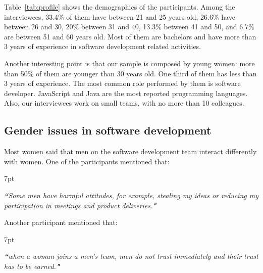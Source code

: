 \documentclass{IEEEcsmag}
\newenvironment{formal}{%
  \def\FrameCommand{%
    \hspace{1pt}%
    {\color{formalshade}\vrule width 2pt}%
    {\color{formalshade}\vrule width 4pt}%
    \colorbox{formalshade}%
  }%
  \MakeFramed{\advance\hsize-\width\FrameRestore}%
  \noindent\hspace{-4.55pt}%
  \begin{adjustwidth}{}{7pt}%
  \vspace{2pt}\vspace{2pt}%
}
{%
  \vspace{2pt}\end{adjustwidth}\endMakeFramed%
}
\begin{document}
Table~\ref{tab:profile} shows the demographics of the participants. Among the interviewees, 33.4\% of them have between 21 and 25 years old, 26.6\% have between 26 and 30, 20\% between 31 and 40, 13.3\% between 41 and 50, and 6.7\% are between  51 and 60 years old. Most of them are bachelors and have more than 3 years of experience in software development related activities. 

Another interesting point is that our sample is composed by young women: more than 50\% of them are younger than 30 years old. One third of them has less than 3 years of experience. The most common role performed by them is software developer. JavaScript and Java are the most reported programming languages. Also, our interviewees work on small teams, with no more than 10 colleagues. 




\subsection{Gender issues in software development}
\label{subsec:percep}


Most women said that men on the software development team interact differently with women. One of the participants mentioned that: 
\begin{formal}
\emph{{\bf``}Some men have harmful attitudes, for example, stealing my ideas or reducing my participation in meetings and product deliveries.{\bf"}}
\end{formal}


Another participant mentioned that: 
\begin{formal}
\emph{{\bf``}when a woman joins a men's team, men do not trust immediately and their trust has to be earned.{\bf"}}
\end{formal} 
\end{document}
